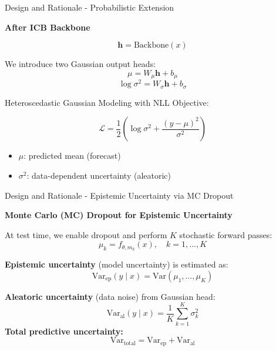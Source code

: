 \documentclass[10pt]{beamer}
\begin{document}
\begin{frame}[fragile]{Design and Rationale - Probabilistic Extension}

\textbf{After ICB Backbone}

\[
\mathbf{h} = \text{Backbone}(x)
\]

We introduce two Gaussian output heads:
\[
\mu = W_{\mu}\mathbf{h} + b_{\mu}
\]
\[
\log \sigma^2 = W_{\sigma}\mathbf{h} + b_{\sigma}
\]

Heteroscedastic Gaussian Modeling with NLL Objective:

\[
\mathcal{L} = \frac{1}{2}\left(\log \sigma^2 + \frac{(y - \mu)^2}{\sigma^2}\right)
\]

\begin{itemize}
    \item $\mu$: predicted mean (forecast)
    \item $\sigma^2$: data-dependent uncertainty (aleatoric)
\end{itemize}

\end{frame}

\begin{frame}[fragile]{Design and Rationale - Epistemic Uncertainty via MC Dropout}

\textbf{Monte Carlo (MC) Dropout for Epistemic Uncertainty}

\vspace{0.5em}

At test time, we enable dropout and perform $K$ stochastic forward passes:
\[
\mu_k = f_{\theta, m_k}(x), \quad k = 1, \dots, K
\]

\vspace{0.5em}

\textbf{Epistemic uncertainty} (model uncertainty) is estimated as:
\[
\mathrm{Var}_{\text{ep}}(y \mid x) = \mathrm{Var}(\mu_1, \dots, \mu_K)
\]

\vspace{0.5em}

\textbf{Aleatoric uncertainty} (data noise) from Gaussian head:
\[
\mathrm{Var}_{\text{al}}(y \mid x) = \frac{1}{K} \sum_{k=1}^{K} \sigma_k^2
\]
\textbf{Total predictive uncertainty:}
\[
\mathrm{Var}_{\text{total}} = \mathrm{Var}_{\text{ep}} + \mathrm{Var}_{\text{al}}
\]

\end{frame}
\end{document}
